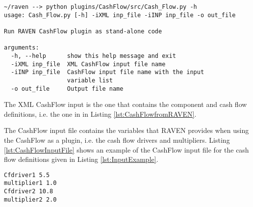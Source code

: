 \small
\begin{lstlisting}[caption=CashFlow run as stand-alone python code, label=lst:CashFlowAsCode]
~/raven --> python plugins/CashFlow/src/Cash_Flow.py -h
usage: Cash_Flow.py [-h] -iXML inp_file -iINP inp_file -o out_file

Run RAVEN CashFlow plugin as stand-alone code

arguments:
  -h, --help      show this help message and exit
  -iXML inp_file  XML CashFlow input file name
  -iINP inp_file  CashFlow input file name with the input 
                  variable list
  -o out_file     Output file name
\end{lstlisting}
\normalsize

The XML CashFlow input is the one that contains the component and cash flow definitions, i.e. the one in  in Listing \ref{lst:CashFlowfromRAVEN}.

The CashFlow input file contains the variables that RAVEN provides when using the CashFlow as a plugin, i.e. the cash flow drivers and multipliers. Listing \ref{lst:CashFlowInputFile} shows an example of the CashFlow input file for the cash flow definitions given in Listing \ref{lst:InputExample}.

\begin{lstlisting}[caption=CashFlow run as stand-alone python code, label=lst:CashFlowInputFile]
Cfdriver1 5.5
multiplier1 1.0
Cfdriver2 10.8
multiplier2 2.0
\end{lstlisting}
